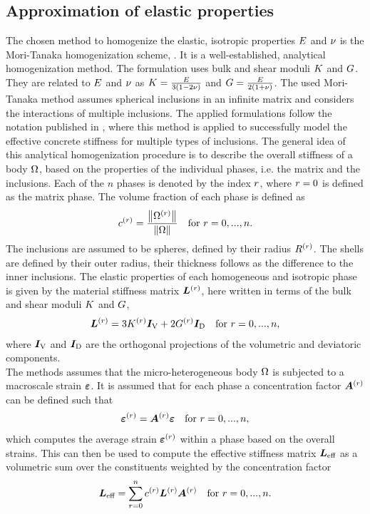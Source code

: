 \subsection{Approximation of elastic properties}
The chosen method to homogenize the elastic, isotropic properties $E$ and $\nu$ is the Mori-Tanaka homogenization scheme, \cite{mor_1973_asi}.
It is a well-established, analytical homogenization method.
The formulation uses bulk and shear moduli $K$ and $G$.
They are related to $E$ and $\nu$ as $K = \frac{E}{3(1-2\nu)}$ and $G = \frac{E}{2(1+\nu)}$.
The used Mori-Tanaka method assumes spherical inclusions in an infinite matrix and considers the interactions of multiple inclusions.
The applied formulations follow the notation published in 
\cite{nee_2012_ammf}, where this method is applied to successfully model the effective concrete stiffness for multiple types of inclusions.
The general idea of this analytical homogenization procedure is to describe the overall stiffness of a body $\Omega$, based on the properties of the individual phases, i.e. the matrix and the inclusions.
Each of the $n$ phases is denoted by the index $r$, where $r = 0$ is defined as the matrix phase.
The volume fraction of each phase is defined as
\begin{align}
	c^{(r)} = \frac{\left\| \Omega^{(r)} \right\|}{\left\| \Omega \right\|} \quad  \text{for}~ r = 0, ..., n.
\end{align}
The inclusions are assumed to be spheres, defined by their radius $R^{(r)}$.
The shells are defined by their outer radius, their thickness follows as the difference to the inner inclusions.
The elastic properties of each homogeneous and isotropic phase is given by the material stiffness matrix $\boldsymbol{L}^{(r)}$, here written in terms of the bulk and shear moduli $K$ and $G$,
\begin{align}
	\boldsymbol{L}^{(r)}= 3 K^{(r)} \boldsymbol{I}_{\text{V}} + 2 G^{(r)} \boldsymbol{I}_{\text{D}}  \quad \text{for}~ r = 0, ..., n, \label{eq:Lr}
\end{align}
where $\boldsymbol{I}_{\text{V}}$ and $\boldsymbol{I}_{\text{D}}$ are the orthogonal projections of the volumetric and deviatoric components.\\
The methods assumes that the micro-heterogeneous body $\Omega$ is subjected to a macroscale strain $\boldsymbol{\varepsilon}$.
It is assumed that for each phase a concentration factor $\boldsymbol{A}^{(r)}$ can be defined such that
\begin{align}
	\boldsymbol{\varepsilon}^{(r)} = \boldsymbol{A}^{(r)}\boldsymbol{\varepsilon} \quad  \text{for}~ r = 0, ..., n, \label{eq:strainaverage}
\end{align}
which computes the average strain $\boldsymbol{\varepsilon}^{(r)}$ within a phase based on the overall strains.
This can then be used to compute the effective stiffness matrix $\boldsymbol{L}_{\text{eff}}$ as a volumetric sum over the constituents weighted by the concentration factor 
\begin{align}
	\boldsymbol{L}_{\text{eff}} = \sum_{r=0}^{n} c^{(r)} \boldsymbol{L}^{(r)}\boldsymbol{A}^{(r)} \quad  \text{for}~ r = 0, ..., n.\label{eq:Leff}
\end{align}

